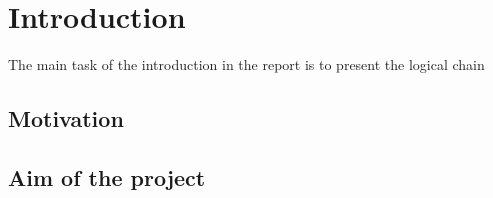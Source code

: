 \chapter{Introduction}
\beginchapter




The main task of the introduction in the report is to present the
logical chain


\section{Motivation}


\section{Aim of the project}


